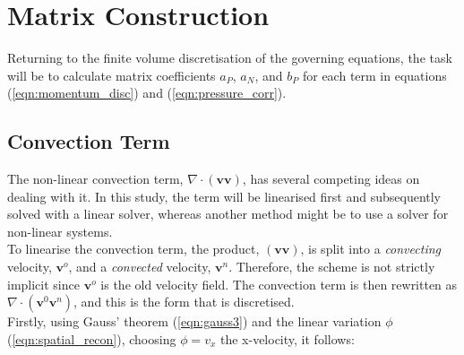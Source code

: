 \documentclass[final,3p,times,twocolumn]{elsarticle}
\begin{document}
\section{Matrix Construction}
\label{sec:matrix_constuction}

Returning to the finite volume discretisation of the governing equations, the task will be to calculate matrix coefficients $a_P$, $a_N$, and $b_P$ for each term in equations (\ref{eqn:momentum_disc}) and (\ref{eqn:pressure_corr}). 

\subsection{Convection Term}

The non-linear convection term, $\nabla \cdot (\mathbf{v v})$, has several competing ideas on dealing with it. In this study, the term will be linearised first and subsequently solved with a linear solver, whereas another method might be to use a solver for non-linear systems. \\
To linearise the convection term, the product, $(\mathbf{v v})$, is split into a \textit{convecting} velocity, $\mathbf{v}^o$, and a \textit{convected} velocity, $\mathbf{v}^n$. Therefore, the scheme is not strictly implicit since $\mathbf{v}^o$ is the old velocity field. The convection term is then rewritten as $\nabla \cdot (\mathbf{v}^0 \mathbf{v}^n)$, and this is the form that is discretised. \\ 
Firstly, using Gauss' theorem (\ref{eqn:gauss3}) and the linear variation $\phi$ (\ref{eqn:spatial_recon}), choosing $\phi = v_x$ the x-velocity, it follows:
\end{document}
